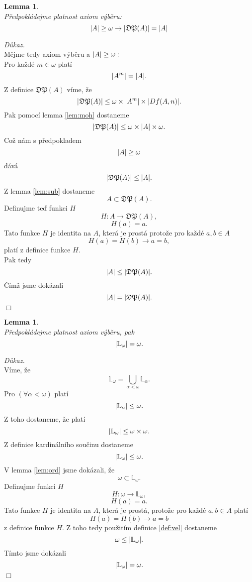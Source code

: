 \documentclass[12pt,a4paper]{article}
\newtheorem{lemma}[veta]{Lemma}
\newenvironment{proof}
{\noindent \textit{D\r{u}kaz.}}
{\hspace*{\fill} $\Box$}
\begin{document}
\begin{lemma}
~\\
\label{lem:mohdef}
P\v{r}edpokl\'{a}dejme platnost axiom v\'{y}b\v{e}ru:\\
\[ \arrowvert A \arrowvert \geq  \omega \rightarrow \arrowvert \mathfrak{DP}(A)\arrowvert=\arrowvert A \arrowvert\]
\end{lemma}
\begin{proof}~\\
M\v{e}jme tedy  axiom v\'{y}b\v{e}ru a $ \arrowvert A \arrowvert \geq \omega :$\\
Pro ka\v{z}d\'{e} $ m \in \omega $ plat\'{i}
 \[ \arrowvert A^m \arrowvert= \arrowvert A \arrowvert .\]
Z definice $ \mathfrak{DP}(A) $ v\'{i}me, \v{z}e 
\[ \arrowvert \mathfrak{DP}(A) \arrowvert \leq \omega \times \arrowvert A^m \arrowvert \times \arrowvert  Df(A,n)\arrowvert .\] 
Pak pomoc\'{i} lemma \ref{lem:moh} dostaneme
\[ \arrowvert \mathfrak{DP}(A) \arrowvert \leq \omega \times \arrowvert A \arrowvert \times \omega .\]
Co\v{z} n\'{a}m s p\v{r}edpokladem 
\[ \arrowvert A \arrowvert \geq  \omega \]
d\'{a}v\'{a}
\[ \arrowvert \mathfrak{DP}(A) \arrowvert \leq  \arrowvert A \arrowvert .\]
Z lemma \ref{lem:sub} dostaneme \[  A \subset \mathfrak{DP}(A)  .\]
Definujme te\v{d} funkci $ H $ 
\[ H: A \rightarrow \mathfrak{DP}(A), \]
\[ H(a)=a  . \]
Tato funkce $ H $ je identita na $ A $, kter\'{a} je  prost\'{a} proto\v{z}e pro ka\v{z}d\'{e} $ a,b \in A $ \[ H(a)=H(b) \rightarrow a=b, \] plat\'{i} z definice funkce $ H $.\\ Pak tedy 
\[ \arrowvert A \arrowvert \leq  \arrowvert \mathfrak{DP}(A) \arrowvert .\]
\v{C}\'{i}m\v{z} jsme dok\'{a}zali
\[ \arrowvert A \arrowvert = \arrowvert \mathfrak{DP}(A) \arrowvert .\]
\end{proof} 
\begin{lemma}
~\\
\label{lem:velomg}
P\v{r}edpokl\'{a}dejme platnost axiom v\'{y}b\v{e}ru, pak
\[  \arrowvert \mathbb{L}_\omega \arrowvert = \omega .\]
 \end{lemma}
 \begin{proof}~\\
 V\'{i}me, \v{z}e
 \[ \mathbb{L}_\omega = \bigcup_{\alpha < \omega}\mathbb{L}_\alpha .\]
Pro $ (\forall \alpha < \omega) $ plat\'{i}
\[  \arrowvert \mathbb{L}_\alpha \arrowvert \leq \omega .\]
Z toho dostaneme, \v{z}e plat\'{i} 
 \[ \arrowvert \mathbb{L}_\omega \arrowvert \leq  \omega   \times \omega . \]
 Z definice kardin\'{a}ln\'{i}ho sou\v{c}inu  dostaneme
\[  \arrowvert \mathbb{L}_\omega \arrowvert \leq  \omega .\]
V lemma \ref{lem:ord} jsme dok\'{a}zali, \v{z}e \[ \omega \subset \mathbb{L}_\omega .\]
Definujme funkci $ H $ 
\[ H: \omega \rightarrow \mathbb{L}_\omega, \]
\[ H(a)=a  . \]
Tato funkce $ H $ je identita na $ A $, kter\'{a} je  prost\'{a}, proto\v{z}e pro ka\v{z}d\'{e} $ a,b \in A $ plat\'{i}\[ H(a)=H(b) \rightarrow a=b \] z definice funkce $ H $. Z toho tedy pou\v{z}it\'{i}m definice \ref{def:vel} dostaneme
\[\omega  \leq \arrowvert \mathbb{L}_\omega \arrowvert  .\]
T\'{i}mto jsme dok\'{a}zali
\[ \arrowvert \mathbb{L}_\omega \arrowvert = \omega .\]
\end{proof}
\end{document}
